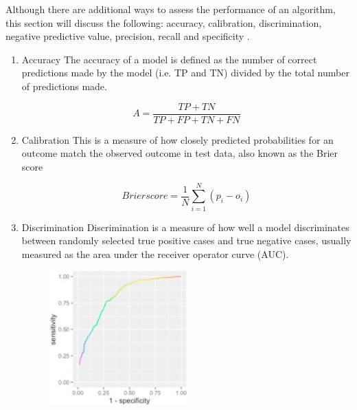 Although there are additional ways to assess the performance of an algorithm, this section will discuss the following: accuracy, calibration, discrimination, negative predictive value, precision, recall and specificity \citep{Callahan:2017bz}.

\begin{enumerate}
    \item Accuracy \newline
    The accuracy of a model is defined as the number of correct predictions made by the model (i.e. TP and TN) divided by the total number of predictions made.
    
    \begin{equation}
        A = \frac{TP + TN}{TP + FP + TN + FN}
    \end{equation}
    
    \item Calibration\newline
    This is a measure of how closely predicted probabilities for an outcome match the observed outcome in test data, also known as the Brier score
    
    \begin{equation}
        Brier score = \frac{1}{N} \sum_{i=1}^{N} (p_{i} - o_{i})
    \end{equation}
    
    \item{Discrimination}\newline
    Discrimination is a measure of how well a model discriminates between randomly selected true positive cases and true negative cases, usually measured as the area under the receiver operator curve (AUC).
    
    \begin{figure}[H]
    \centering
    \includegraphics[width=0.5\textwidth]{ThesisTemplate/usingLatex/images/AUC.png}
    \label{fig:aucLearning}
    \end{figure}
    

\end{enumerate}
